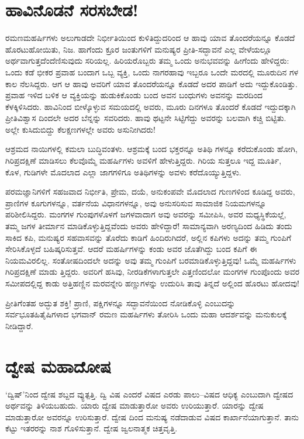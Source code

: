 \section{ಹಾವಿನೊಡನೆ ಸರಸಬೇಡ!}

ರಮಣಮಹರ್ಷಿಗಳು ಅಲುಗಾಡದೇ ನಿರ್ಭೀತಿಯಿಂದ ಕುಳಿತಿದ್ದುದರಿಂದ ಆ ಹಾವು ಯಾವ ತೊಂದರೆಯನ್ನೂ ಕೊಡದೆ ಹೊರಟುಹೋಯಿತು, ನಿಜ. ಹಾಗೆಂದು ಕ್ರೂರ ಜಂತುಗಳಿಗೆ ಮನುಷ್ಯರ ಪ್ರೀತಿ-ಸದ್ಭಾವನೆ ಎಲ್ಲ ವೇಳೆಯಲ್ಲೂ ಅರ್ಥವಾಗುತ್ತದೆಂದೆಣಿಸುವುದು ಸರಿಯಲ್ಲ. ಹಿರಿಯರೊಬ್ಬರು ತಮ್ಮ ಒಂದು ಅನುಭವವನ್ನು ಹೀಗೆಂದು ಹೇಳಿದ್ದರು: ಒಂದು ಕಡೆ ಭೀಕರ ಪ್ರವಾಹ ಬಂದಾಗ ಒಬ್ಬ ವ್ಯಕ್ತಿ, ಒಂದು ನಾಗರಹಾವು ಇಬ್ಬರೂ ಒಂದೇ ಮರದಲ್ಲಿ ಮೂರುದಿನ ಗಳ ಕಾಲ ನೆಲಸಿದ್ದರು. ಆಗ ಆ ಹಾವು ಅವರಿಗೆ ಯಾವ ತೊಂದರೆಯನ್ನೂ ಕೊಡದೆ ಅದರ ಪಾಡಿಗೆ ಅದು ಇದ್ದುಕೊಂಡಿತ್ತು. ಪ್ರವಾಹ ಇಳಿದ ಬಳಿಕ ಆ ವ್ಯಕ್ತಿಯನ್ನು ಹುಡುಕಿಕೊಂಡು ಬಂದ ಅವನ ಬಂಧುಗಳು ಅವನನ್ನು ಮರದಿಂದ ಕೆಳಕ್ಕಿಳಿಸಿದರು. ಹಾವಿನಿಂದ ಬೀಳ್ಕೊಳ್ಳುವ ಸಮಯದಲ್ಲಿ ಅವರು, ಮೂರು ದಿನಗಳೂ ತೊಂದರೆ ಕೊಡದೆ ಇದ್ದುದಕ್ಕಾಗಿ ಪ್ರೀತಿವಿಶ್ವಾಸ ದಿಂದಲೇ ಅದರ ಬೆನ್ನನ್ನು ಸವರಿದರು. ಹಾವು ಥಟ್ಟನೇ ಸಿಟ್ಟಿಗೆದ್ದು ಅವರನ್ನು ಬಲವಾಗಿ ಕಚ್ಚಿ ಬಿಟ್ಟಿತು. ಅಲ್ಲೇ ಕುಸಿದುಬಿದ್ದು ಕೆಲಕ್ಷಣಗಳಲ್ಲೇ ಅವರು ಅಸುನೀಗಿದರು!

ಆಶ್ರಮದ ನಾಯಿಗಳಲ್ಲಿ ಕಮಲಾ ಬುದ್ಧಿವಂತಳು. ಆಶ್ರಮಕ್ಕೆ ಬಂದ ಭಕ್ತರನ್ನೂ ಅತಿಥಿ ಗಳನ್ನೂ ಕರೆದುಕೊಂಡು ಹೋಗಿ, ಗಿರಿಪ್ರದಕ್ಷಿಣೆ ಮಾಡಿಸಲು ಕೆಲವೊಮ್ಮೆ ಮಹರ್ಷಿಗಳು ಅವಳಿಗೆ ಹೇಳುತ್ತಿದ್ದರು. ಗಿರಿಯ ಸುತ್ತಲೂ ಇದ್ದ ಮೂರ್ತಿ, ಕೊಳ, ಗುಡಿಗಳೇ ಮೊದಲಾದ ಎಲ್ಲಾ ಜಾಗಗಳಿಗೂ ಅತಿಥಿಗಳನ್ನು ಅವಳು ಕರೆದೊಯ್ಯುತ್ತಿದ್ದಳು.

ಪರಮಜ್ಞಾನಿಗಳಿಗೆ ಸಹಜವಾದ ನಿರ್ಭೀತಿ, ಪ್ರೇಮ, ದಯೆ, ಅನುಕಂಪವೇ ಮೊದಲಾದ ಗುಣಗಳಿಂದ ಕೂಡಿದ್ದ ಅವರು, ಪ್ರಾಣಿಗಳ ಕೂಗುಗಳನ್ನೂ, ವರ್ತನೆಯ ವಿಧಾನಗಳನ್ನೂ, ಅವು ಅನುಸರಿಸುವ ಸಾಮಾಜಿಕ ನಿಯಮಗಳನ್ನೂ ಪರಿಶೀಲಿಸಿದ್ದರು. ಮಂಗಗಳ ಗುಂಪುಗಳೊಳಗೆ ಜಗಳವಾದಾಗ ಅವು ಅವರನ್ನು ಸಮೀಪಿಸಿ, ಅವರ ಮಧ್ಯಸ್ಥಿಕೆಯಲ್ಲೆ, ತಮ್ಮ ಜಗಳ ತೀರ್ಮಾನ ಮಾಡಿಕೊಳ್ಳುತ್ತಿದ್ದವೆಂದು ಅವರು ಹೇಳಿದ್ದಾರೆ! ಸಾಮಾನ್ಯವಾಗಿ ಅರಣ್ಯದಿಂದ ಹಿಡಿದು ತಂದು ಸಾಕಿದ ಕಪಿ, ಮನುಷ್ಯರ ಸಹವಾಸವನ್ನು ತೊರೆದು ಕಾಡಿಗೆ ಹಿಂದಿರುಗಿದರೆ, ಅಲ್ಲಿನ ಕಪಿಗಳು ಅದನ್ನು ತಮ್ಮ ಗುಂಪಿಗೆ ಸೇರಿಸಿಕೊಳ್ಳದೆ ಬಹಿಷ್ಕರಿಸುತ್ತವೆ. ಆದರೆ ಮಹರ್ಷಿಗಳನ್ನು ಕಂಡು ಅವರ ಜೊತೆಗಿದ್ದು ಬಂದ ಕಪಿಗೆ ಈ ನಿಯಮವಿರಲಿಲ್ಲ. ಸಂತೋಷದಿಂದಲೇ ಅದನ್ನು ಅವು ತಮ್ಮ ಗುಂಪಿಗೆ ಬರಮಾಡಿಕೊಳ್ಳುತ್ತಿದ್ದವು! ಒಮ್ಮೆ ಮಹರ್ಷಿಗಳು ಗಿರಿಪ್ರದಕ್ಷಿಣೆ ಮಾಡು ತ್ತಿದ್ದರು. ಅವರಿಗೆ ಹಸಿವು, ನೀರಡಿಕೆಗಳಾಗುತ್ತಲೇ ಎತ್ತಣಿಂದಲೋ ಮಂಗಗಳ ಗುಂಪೊಂದು ಅವರ ಸಮೀಪದಲ್ಲಿದ್ದ ಕಾಡು ಅತ್ತಿಹಣ್ಣಿನ ಮರವನ್ನೇರಿ ಹಣ್ಣುಗಳನ್ನು ಉದುರಿಸಿ ತಾವು ತಿನ್ನದೆ ಅಲ್ಲಿಂದ ಹೊರಟು ಹೋದವು!

ಪ್ರೀತಿಗೆಂತಹ ಅದ್ಭುತ ಶಕ್ತಿ! ಪ್ರಾಣಿ, ಪಕ್ಷಿಗಳನ್ನೂ ಸದ್ಭಾವನೆಯಿಂದ ನೋಡಿಕೊಳ್ಳಿ ಎಂಬುದನ್ನು ಸರ್ವಭೂತಹಿತೈಷಿಗಳಾದ ಭಗವಾನ್ ರಮಣ ಮಹರ್ಷಿಗಳು ತೋರಿಸಿ ಒಂದು ಮಹಾ ಆದರ್ಶವನ್ನು ಮನುಕುಲಕ್ಕೆ ನೀಡಿದ್ದಾರೆ.


\section{ದ್ವೇಷ ಮಹಾದೋಷ}

‘ದ್ವಿಷ್​’ನಿಂದ ದ್ವೇಷ ಶಬ್ದದ ವ್ಯುತ್ಪತ್ತಿ. ದ್ವಿ ವಿಷ ಎಂದರೆ ವಿಷದ ಎರಡು ಪಾಲು–ವಿಷದ ಆಧಿಕ್ಯ ಎಂಬುದಾಗಿ ದ್ವೇಷದ ಅರ್ಥವನ್ನು ತಿಳಿಯಬಹುದು. ಯಾರು ದ್ವೇಷ ಮಾಡುತ್ತಾರೋ ಅವರು ಉರಿಯುತ್ತಾರೆ. ಯಾರನ್ನು ದ್ವೇಷ ಮಾಡುತ್ತಾರೋ ಅವರನ್ನೂ ಉರಿಸುತ್ತಾರೆ. ದ್ವೇಷ ದಿಂದ ಮನುಷ್ಯ ನಡೆದಾಡುವ ವಿಷದ ಕಾರ್ಖಾನೆಯಾಗುತ್ತಾನೆ. ತಾನು ಕೆಟ್ಟು ಇತರರನ್ನು ನಾಶ ಗೊಳಿಸುತ್ತಾನೆ. ದ್ವೇಷ ಜ್ವಲನಾತ್ಮಕ ಚಿತ್ತವೃತ್ತಿ.

